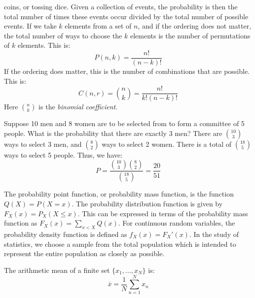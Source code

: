 \documentclass[crop=false,class=book,oneside]{standalone}                      %
\begin{document}
        coins, or tossing dice. Given a collection of events, the probability
        is then the total number of times these events occur divided by
        the total number of possible events. If we take $k$ elements from
        a set of $n$, and if the ordering does not matter, the total number of
        ways to choose the $k$ elements is the number of permutations of $k$
        elements. This is:
        \begin{equation*}
            P(n,k)=\frac{n!}{(n-k)!}
        \end{equation*}
        If the ordering does matter, this is the number of combinations
        that are possible. This is:
        \begin{equation*}
            C(n,r)=\binom{n}{k}=\frac{n!}{k!(n-k)!}
        \end{equation*}
        Here $\binom{n}{k}$ is the \textit{binomial coefficient}.
        \begin{example}
            Suppose 10 men and 8 women are to be selected from to form
            a committee of 5 people. What is the probability that there
            are exactly 3 men? There are $\binom{10}{3}$ ways to
            select 3 men, and $\binom{8}{2}$ ways to select 2 women.
            There is a total of $\binom{18}{5}$ ways to select 5 people.
            Thus, we have:
            \begin{equation*}
                P=\frac{\binom{10}{3}\binom{8}{2}}{\binom{18}{5}}
                =\frac{20}{51}
            \end{equation*}
        \end{example}
        The probability point function, or probability mass function,
        is the function $Q(X)=P(X=x)$. The probability distribution
        function is given by
        $F_{X}(x)=P_{X}(X\leq{x})$. This can be expressed in
        terms of the probability mass function as
        $F_{X}(x)=\sum_{x<X}Q(x)$. For continuous random variables,
        the probability density function is defined as
        $f_{X}(x)=F_{X}'(x)$. In the study of statistics, we choose a sample
        from the total population which is intended to represent the
        entire population as closely as possible.
        \begin{definition}
            The arithmetic mean of a finite set
            $\{x_{1},\hdots,x_{N}\}$ is:
            \begin{equation*}
                \overline{x}=\frac{1}{N}\sum_{n=1}^{N}x_{n}
            \end{equation*}
        \end{definition}
\end{document}
